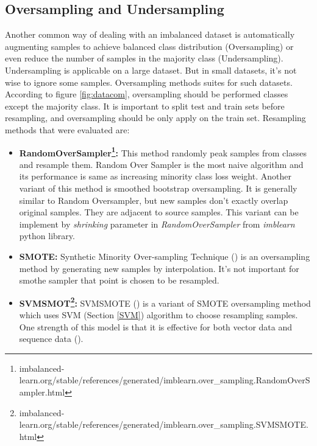 \subsection{Oversampling and Undersampling}
 Another common way of dealing with an imbalanced dataset is automatically augmenting samples to achieve balanced class distribution (Oversampling) or even reduce the number of samples in the majority class (Undersampling). Undersampling is applicable on a large dataset. But in small datasets, it's not wise to ignore some samples. Oversampling methods suites for such datasets. According to figure \ref{fig:datacom}, oversampling should be performed classes except the majority class. It is important to split test and train sets before resampling, and oversampling should be only apply on the train set. Resampling methods that were evaluated are: 
\begin{itemize}
	\item \textbf{RandomOverSampler\footnote{imbalanced-learn.org/stable/references/generated/imblearn.over\_sampling.RandomOverSampler.html}:} This method randomly peak samples from classes and resample them. Random Over Sampler is the most naive algorithm and its performance is same as increasing minority class loss weight. Another variant of this method is smoothed bootstrap oversampling. It is generally similar to Random Oversampler, but new samples don't exactly overlap original samples. They are adjacent to source samples. This variant can be implement by \textit{shrinking} parameter in \textit{RandomOverSampler} from \textit{imblearn} python library. 
	
	\item \textbf{SMOTE:} 
	Synthetic Minority Over-sampling Technique (\cite{smothe}) is an oversampling method by generating new samples by interpolation. It's not important for smothe sampler that point is chosen to be resampled. 
	
	\item \textbf{SVMSMOT\footnote{imbalanced-learn.org/stable/references/generated/imblearn.over\_sampling.SVMSMOTE.html}:} 
	SVMSMOTE (\cite{svmsmothe}) is a variant of SMOTE oversampling method which uses SVM (Section \ref{SVM}) algorithm to choose resampling samples. One strength of this model is that it is effective for both vector data and sequence data (\cite{svmsmothe}).
	

\end{itemize}
